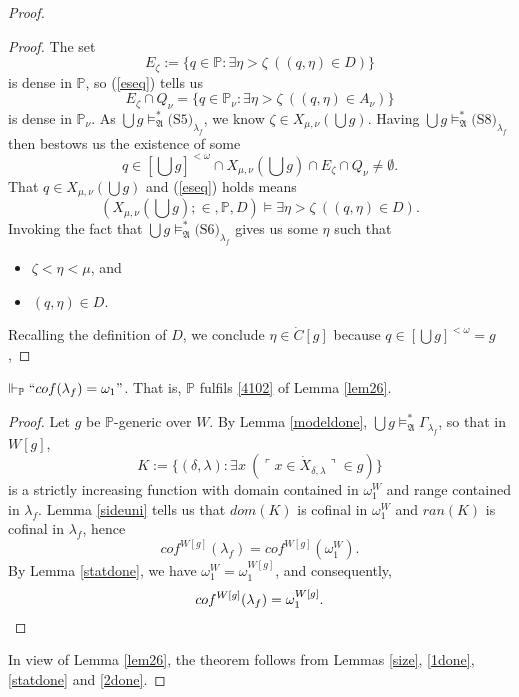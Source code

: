 \documentclass[12pt]{article}
\numberwithin{equation}{section}
\begin{document}
\begin{proof}
\begin{proof}
The set $$E_{\zeta} := \{q \in \mathbb{P} : \exists \eta > \zeta \ ((q, \eta) \in D)\}$$ is dense in $\mathbb{P}$, so (\ref{eseq}) tells us $$E_{\zeta} \cap Q_{\nu} = \{q \in \mathbb{P}_{\nu} : \exists \eta > \zeta \ ((q, \eta) \in A_{\nu})\}$$ is dense in $\mathbb{P}_{\nu}$. As $\bigcup g \models^*_{\mathfrak{A}} \text{(S5)}_{\lambda_f}$, we know $\zeta \in X_{\mu, \nu}(\bigcup g)$. Having $\bigcup g \models^*_{\mathfrak{A}} \text{(S8)}_{\lambda_f}$ then bestows us the existence of some $$q \in [\bigcup g]^{< \omega} \cap X_{\mu, \nu}(\bigcup g) \cap E_{\zeta} \cap Q_{\nu} \neq \emptyset.$$ That $q \in X_{\mu, \nu}(\bigcup g)$ and (\ref{eseq}) holds means $$(X_{\mu, \nu}(\bigcup g); \in, \mathbb{P}, D) \models \exists \eta > \zeta \ ((q, \eta) \in D).$$ Invoking the fact that $\bigcup g \models^*_{\mathfrak{A}} \text{(S6)}_{\lambda_f}$ gives us some $\eta$ such that 
\begin{itemize}
    \item $\zeta < \eta < \mu$, and
    \item $(q, \eta) \in D$.
\end{itemize} 
Recalling the definition of $D$, we conclude $\eta \in \dot{C}[g]$ because $q \in [\bigcup g]^{< \omega} = g$, 
\end{proof}

\begin{lem}\label{2done}
$\Vdash_{\mathbb{P}} ``cof(\lambda_f) = \omega_1"$. That is, $\mathbb{P}$ fulfils \ref{4102} of Lemma \ref{lem26}.
\end{lem}

\begin{proof}
Let $g$ be $\mathbb{P}$-generic over $W$. By Lemma \ref{modeldone}, $\bigcup g \models^*_{\mathfrak{A}} \Gamma_{\lambda_f}$, so that in $W[g]$, $$K := \{(\delta, \lambda) : \exists x \ (\ulcorner x \in \dot{X}_{\delta, \lambda} \urcorner \in g)\}$$ is a strictly increasing function with domain contained in $\omega_1^W$ and range contained in $\lambda_f$. Lemma \ref{sideuni} tells us that $dom(K)$ is cofinal in $\omega_1^W$ and $ran(K)$ is cofinal in $\lambda_f$, hence $$cof^{W[g]}(\lambda_f) = cof^{W[g]}(\omega_1^W).$$ By Lemma \ref{statdone}, we have $\omega_1^W = \omega_1^{W[g]}$, and consequently, 
\begin{equation*}
    cof^{W[g]}(\lambda_f) = \omega_1^{W[g]}.
    \qedhere
\end{equation*}
\end{proof}

In view of Lemma \ref{lem26}, the theorem follows from Lemmas \ref{size}, \ref{1done}, \ref{statdone} and \ref{2done}.
\end{proof}
\end{document}
